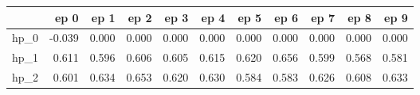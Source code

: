 \begin{tabular}{lrrrrrrrrrr}
\toprule
{} &   ep 0 &   ep 1 &   ep 2 &   ep 3 &   ep 4 &   ep 5 &   ep 6 &   ep 7 &   ep 8 &   ep 9 \\
\midrule
hp\_0 & -0.039 &  0.000 &  0.000 &  0.000 &  0.000 &  0.000 &  0.000 &  0.000 &  0.000 &  0.000 \\
hp\_1 &  0.611 &  0.596 &  0.606 &  0.605 &  0.615 &  0.620 &  0.656 &  0.599 &  0.568 &  0.581 \\
hp\_2 &  0.601 &  0.634 &  0.653 &  0.620 &  0.630 &  0.584 &  0.583 &  0.626 &  0.608 &  0.633 \\
\bottomrule
\end{tabular}
